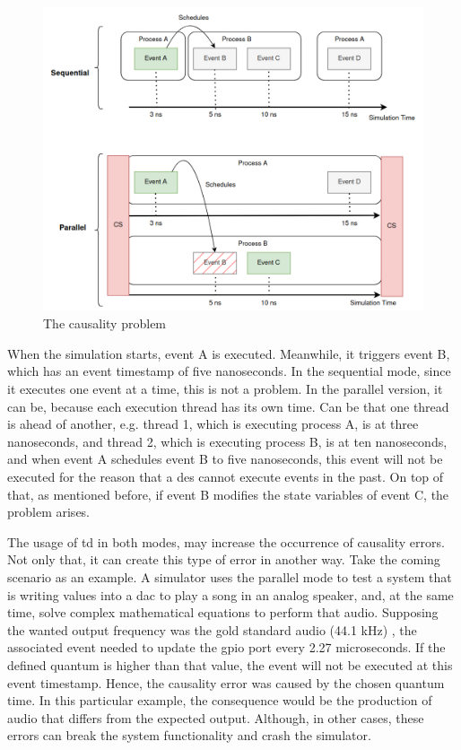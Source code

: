 \begin{figure}[H]
	\centering
 	\includegraphics[width=0.8\linewidth]{Images/CausalityError.png}
 	\caption{The causality problem}
	 \label{fig_causalityError}
\end{figure}

When the simulation starts, event A is executed. Meanwhile, it triggers event B, which has an event timestamp of five nanoseconds. In the 
sequential mode, since it executes one event at a time, this is not a problem. In the parallel version, it can be, because each execution 
thread has its own time. Can be that one thread is ahead of another, e.g. thread 1, which is executing process A, is at three nanoseconds, 
and thread 2, which is executing process B, is at ten nanoseconds, and when event A schedules event B to five nanoseconds, this event will 
not be executed for the reason that a \gls{des} cannot execute events in the past. On top of that, as mentioned before, if event B modifies 
the state variables of event C, the problem arises. 

The usage of \gls{td} in both modes, may increase the occurrence of causality errors. Not only that, it can create this type of error in 
another way. Take the coming scenario as an example. A simulator uses the parallel mode to test a system that is writing values into a 
\gls{dac} to play a song in an analog speaker, and, at the same time, solve complex mathematical equations to perform that audio. Supposing 
the wanted output frequency was the gold standard audio (44.1 kHz) \cite{audio}, the associated event needed to update the \gls{gpio} port 
every 2.27 microseconds. If the defined quantum is higher than that value, the event will not be executed at this event timestamp. Hence, 
the causality error was caused by the chosen quantum time. In this particular example, the consequence would be the production of audio 
that differs from the expected output. Although, in other cases, these errors can break the system functionality and crash the simulator. 

